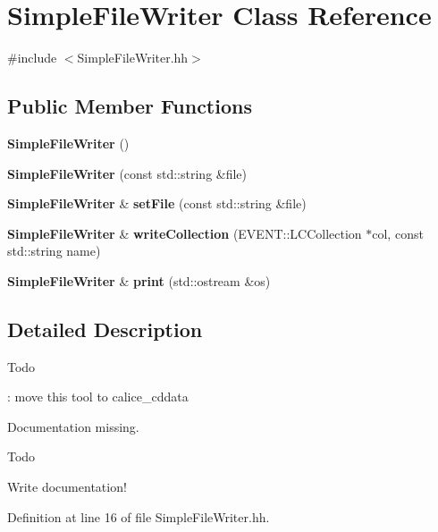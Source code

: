 \section{Simple\-File\-Writer Class Reference}
\label{classSimpleFileWriter}


{\ttfamily \#include $<$Simple\-File\-Writer.\-hh$>$}

\subsection*{Public Member Functions}
\begin{DoxyCompactItemize}
\item 
{\bf Simple\-File\-Writer} ()
\item 
{\bfseries Simple\-File\-Writer} (const std\-::string \&file)\label{classSimpleFileWriter_aaa81aa77699063edff9e1b0b2c83be3c}

\item 
{\bf Simple\-File\-Writer} \& {\bfseries set\-File} (const std\-::string \&file)\label{classSimpleFileWriter_a86410980c38a2199324a4b281439c63d}

\item 
{\bf Simple\-File\-Writer} \& {\bfseries write\-Collection} (E\-V\-E\-N\-T\-::\-L\-C\-Collection $\ast$col, const std\-::string name)\label{classSimpleFileWriter_a7b384ee227ea72cd56b1994b8aa96f8b}

\item 
{\bf Simple\-File\-Writer} \& {\bfseries print} (std\-::ostream \&os)\label{classSimpleFileWriter_af76ab8c59d7fb319bc58a8593db9c8cb}

\end{DoxyCompactItemize}


\subsection{Detailed Description}
\begin{DoxyRefDesc}{Todo}
\item[{\bf Todo}]\-: move this tool to calice\-\_\-cddata \end{DoxyRefDesc}
Documentation missing. \begin{DoxyRefDesc}{Todo}
\item[{\bf Todo}]Write documentation!\end{DoxyRefDesc}


Definition at line 16 of file Simple\-File\-Writer.\-hh.



